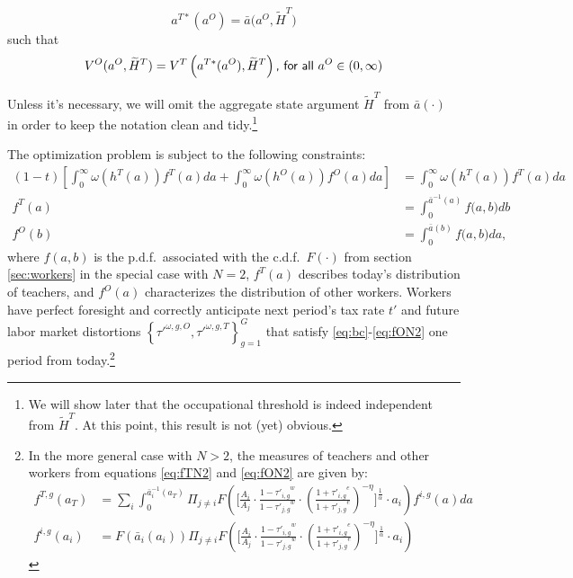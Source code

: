 \documentclass[onehalfspacing,11pt]{article}
\begin{document}
\begin{equation*}
a^{T*}(a^O) = \bar{a}\big(a^{O},\widetilde{H}^T\big) %
\end{equation*}
such that
\begin{equation}
\label{eq:indiff}
V^{O}(a^{O},\widetilde{H}^T) = V^{T}\left(a^{T*}(a^O),\widetilde{H}^T\right) \textrm{{\sf , for all} } a^O \in (0,\infty)
\end{equation}

Unless it's necessary, we will omit the aggregate state argument $\widetilde{H}^T$ from $\bar{a}(\cdot)$ in order to keep the notation clean and tidy.\footnote{We will show later that the occupational threshold is indeed independent from $\widetilde{H}^T$. At this point, this result is not (yet) obvious.}

The optimization problem is subject to the following constraints:
\begin{align}
\left( 1-t \right) \left[ \int_0^\infty \omega\left(h^{T}(a)\right) {f}^T(a) da + \int_0^\infty \omega\left(h^{O}(a)\right) {f}^O(a) da \right] & = \int_0^\infty \omega\left(h^{T}(a)\right) {f}^T(a) da \label{eq:bc} \\%
f^T(a) & = \int_0^{\bar{a}^{-1}\left(a\right)} f\big(a,b \big) db \label{eq:fTN2}\\
f^O(b) & = \int_0^{\bar{a}\left(b\right)} f\big(a,b \big) da, \label{eq:fON2}
\end{align}
where $f(a,b)$ is the p.d.f.~associated with the c.d.f.~$F(\cdot)$ from section \ref{sec:workers} in the special case with $N=2$, $f^T(a)$ describes today's distribution of teachers, and $f^O(a)$ characterizes the distribution of other workers. Workers have perfect foresight and correctly anticipate next period's tax rate $t'$ and future labor market distortions $\left\{ {\tau'}^{\omega,g,O}, {\tau'}^{\omega,g,T} \right\}_{g =1}^G$ that satisfy \eqref{eq:bc}-\eqref{eq:fON2} one period from today.\footnote{In the more general case with $N>2$, the measures of teachers and other workers from equations \eqref{eq:fTN2} and \eqref{eq:fON2} are given by:
\begin{align*}
f^{T,g}(a_T) & = \sum_i \int_0^{\bar{a}_i^{-1}\left(a_T\right)} \Pi_{j\neq i} F\left(\Bigg[\frac{A_i}{A_j}\cdot\frac{1-{\tau'_{i,g}}^w}{1-{\tau'_{j,g}}^w} \cdot \left(\frac{1+{\tau'_{i,g}}^e}{1+{\tau'_{j,g}}^e} \right)^{-\eta}\Bigg]^\frac{1}{\alpha}\cdot a_i\right)f^{i,g}(a)da \\
f^{i,g}(a_i) & = F(\bar{a}_i(a_i)) \Pi_{j\neq i} F\left(\Bigg[\frac{A_i}{A_j}\cdot\frac{1-{\tau'_{i,g}}^w}{1-{\tau'_{j,g}}^w} \cdot \left(\frac{1+{\tau'_{i,g}}^e}{1+{\tau'_{j,g}}^e} \right)^{-\eta}\Bigg]^\frac{1}{\alpha} \cdot a_i\right)
\end{align*}
}
 
\end{document}
